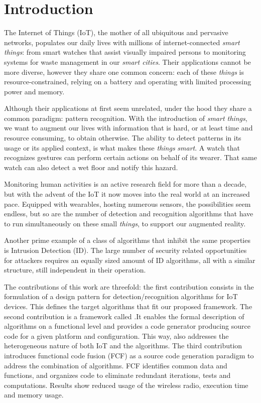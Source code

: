 \documentclass[3p,times,procedia]{elsarticle}
\begin{document}
\section{Introduction}
\label{introduction}

The Internet of Things (IoT), the mother of all ubiquitous and pervasive
networks, populates our daily lives with millions of internet-connected
\emph{smart things}: from smart watches that assist visually impaired
persons\cite{porzi2013smart} to monitoring systems for waste management in our
\emph{smart cities}\cite{zanella2014internet}. Their applications cannot be
more diverse, however they share one common concern: each of these
\emph{things} is resource-constrained, relying on a battery and operating with
limited processing power and memory.

Although their applications at first seem unrelated, under the hood they share
a common paradigm: pattern recognition. With the introduction of \emph{smart
things}, we want to augment our lives with information that is hard, or at
least time and resource consuming, to obtain otherwise. The ability to detect
patterns in its usage or its applied context, is what makes these \emph{things}
\emph{smart}. A watch that recognizes gestures can perform certain actions on
behalf of its wearer. That same watch can also detect a wet floor and notify
this hazard\cite{porzi2013smart}.

Monitoring human activities is an active research field for more than a
decade\cite{lara2013survey}, but with the advent of the IoT it now moves into
the real world at an increased pace. Equipped with wearables, hosting numerous
sensors, the possibilities seem endless, but so are the number of detection and
recognition algorithms that have to run simultaneously on these small
\emph{things}, to support our augmented reality.

Another prime example of a class of algorithms that inhibit the same properties
is Intrusion Detection (ID). The large number of security related opportunities
for attackers requires an equally sized amount of ID algorithms, all with a
similar structure, still independent in their operation.


The contributions of this work are threefold: the first contribution consists
in the formulation of a design pattern for detection/recognition algorithms for
IoT devices. This defines the target algorithms that fit our proposed
framework. The second contribution is a framework called \FOO.\@ It enables the
formal description of algorithms on a functional level and provides a code
generator producing source code for a given platform and configuration. This
way, \FOO also addresses the heterogeneous nature of both IoT and the
algorithms. The third contribution introduces functional code fusion (FCF) as a
source code generation paradigm to address the combination of algorithms. FCF
identifies common data and functions, and organizes code to eliminate redundant
iterations, tests and computations. Results show reduced usage of the wireless
radio, execution time and memory usage.
\end{document}
